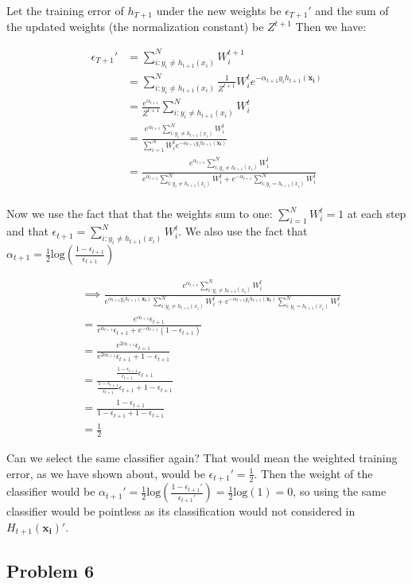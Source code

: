 \documentclass[a4paper,12pt]{article}
\begin{document}
Let the training error of $h_{T+1}$ under the new weights be $\epsilon_{T+1}'$ and the sum of the updated weights (the normalization constant) be $Z^{t+1}$ Then we have:   

$$
\begin{aligned} 
	\epsilon_{T+1}' &= 
	\sum_{i: y_i \neq h_{t+1}(x_i) }^N W_i^{t+1} \\ 
	&= \sum_{i: y_i \neq h_{t+1}(x_i) }^N
	\frac{1}{Z^{t+1}} W_i^{t} e^{
		-\alpha_{t+1}y_ih_{t+1}(\mathbf{x_i}) } \\
	&= \frac{e^{\alpha_{t+1}}}{Z^{t+1}} 
	\sum_{i: y_i \neq h_{t+1}(x_i) }^N W_i^t \\
	&= \frac{e^{\alpha_{t+1}} \sum_{i: y_i \neq h_{t+1}(x_i) }^N W_i^t}{\sum_{i = 1 }^N W_i^{t} 
		e^{-\alpha_{t+1}y_ih_{t+1}(\mathbf{x_i}) } } \\ 
	&= \frac{e^{\alpha_{t+1}} \sum_{i: y_i \neq h_{t+1}(x_i) }^N W_i^t}
	{e^{\alpha_{t+1}}\sum_{i: y_i \neq h_{t+1}(x_i)}^N W_i^t + e^{-\alpha_{t+1}}\sum_{i: y_i = h_{t+1}(x_i)}^N W_i^t }  \\ 
\end{aligned} 
$$

Now we use the fact that that the weights sum to one: $\sum_{i=1}^N W_i^{t} = 1$ at each step and that $\epsilon_{t+1} = \sum_{i: y_i \neq h_{t+1}(x_i)}^N W_i^t$. We also use the fact that $\alpha_{t+1} = \frac{1}{2} \textrm{log}( \frac{1 - \epsilon_{t+1}}{\epsilon_{t+1}} ) $ 

$$
\begin{aligned}
    &\implies \frac{e^{\alpha_{t+1}} \sum_{i: y_i \neq h_{t+1}(x_i) }^N W_i^t}
	{e^{\alpha_{t+1}y_ih_{t+1}(\mathbf{x_i}) } \sum_{i: y_i \neq h_{t+1}(x_i)}^N W_i^t + e^{-\alpha_{t+1}y_ih_{t+1}(\mathbf{x_i}) } \sum_{i: y_i = h_{t+1}(x_i)}^N W_i^t } \\
    &= \frac{e^{\alpha_{t+1}} \epsilon_{t+1} }{ e^{\alpha_{t+1}} \epsilon_{t+1} + e^{-\alpha_{t+1}} (1 - \epsilon_{t+1} ) } \\
    &= \frac{e^{2\alpha_{t+1}} \epsilon_{t+1} }{ e^{2\alpha_{t+1}} \epsilon_{t+1} + 1 - \epsilon_{t+1}} \\
    &= \frac{ \frac{1 - \epsilon_{t+1}}{\epsilon_{t+1}} \epsilon_{t+1}}{\frac{1 - \epsilon_{t+1}}{\epsilon_{t+1}} \epsilon_{t+1} + 1 - \epsilon_{t+1}} \\ 
    &= \frac{1 - \epsilon_{t+1}}{1 - \epsilon_{t+1} + 1 - \epsilon_{t+1}} \\ 
    &= \frac{1}{2} 
\end{aligned} 
$$

Can we select the same classifier again? That would mean the weighted training error, as we have shown about, would be 
$\epsilon_{t+1}' = \frac{1}{2}$. Then the weight of the classifier would be 
$\alpha_{t+1}' = \frac{1}{2} \textrm{log}(\frac{1 - \epsilon_{t+1}'}{\epsilon_{t+1}'}) = \frac{1}{2}\textrm{log}(1) = 0$, so using the same classifier would be pointless as its classification would not considered in $H_{t+1}(\mathbf{x_i})'$. 

\subsection{Problem 6}
\end{document}
